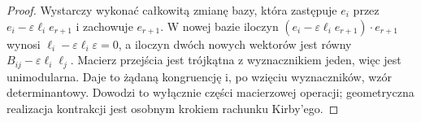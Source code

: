 \begin{proof}
Wystarczy wykonać całkowitą zmianę bazy, która zastępuje
$e_i$ przez $e_i-\varepsilon\ell_i e_{r+1}$ i zachowuje
$e_{r+1}$. W nowej bazie iloczyn
$(e_i-\varepsilon\ell_i e_{r+1})\cdot e_{r+1}$
wynosi $\ell_i-\varepsilon\ell_i\varepsilon=0$,
a iloczyn dwóch nowych wektorów jest równy
$B_{ij}-\varepsilon\ell_i\ell_j$.
Macierz przejścia jest trójkątna z wyznacznikiem jeden,
więc jest unimodularna. Daje to żądaną kongruencję
i, po wzięciu wyznaczników, wzór determinantowy.
Dowodzi to wyłącznie części macierzowej operacji;
geometryczna realizacja kontrakcji jest osobnym krokiem
rachunku Kirby'ego.
\end{proof}

